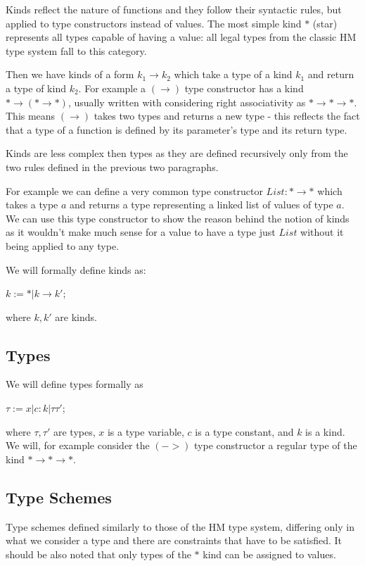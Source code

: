 Kinds reflect the nature of functions and they follow their syntactic rules, but applied to type constructors instead of values. The most simple kind $*$ (star) represents all types capable of having a value: all legal types from the classic HM type system fall to this category.

Then we have kinds of a form $k_1 \rightarrow k_2$ which take a type of a kind $k_1$ and return a type of kind $k_2$. For example a $(\rightarrow)$ type constructor has a kind $* \rightarrow (* \rightarrow *)$, usually written with considering right associativity as $* \rightarrow * \rightarrow *$. This means $(\rightarrow)$ takes two types and returns a new type - this reflects the fact that a type of a function is defined by its parameter's type and its return type.

Kinds are less complex then types as they are defined recursively only from the two rules defined in the previous two paragraphs.

For example we can define a very common type constructor $List: * \rightarrow *$ which takes a type $a$ and returns a type representing a linked list of values of type $a$. We can use this type constructor to show the reason behind the notion of kinds as it wouldn't make much sense for a value to have a type just $List$ without it being applied to any type. %

We will formally define kinds as:

$k := * | k \rightarrow k'$;

where $k, k'$ are kinds.

\subsection{Types}

We will define types formally as

$\tau := x | c : k | \tau \tau'$;

where $\tau, \tau'$ are types, $x$ is a type variable, $c$ is a type constant, and $k$ is a kind. We will, for example consider the $(->)$ type constructor a regular type of the kind $* \rightarrow * \rightarrow *$.

\subsection{Type Schemes}

Type schemes defined similarly to those of the HM type system, differing only in what we consider a type and there are constraints that have to be satisfied. It should be also noted that only types of the $*$ kind can be assigned to values.


